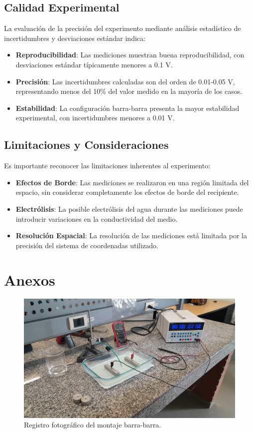 \documentclass[11pt,twocolumn]{article}
\begin{document}
\subsection{Calidad Experimental}

La evaluación de la precisión del experimento mediante análisis estadístico de incertidumbres y desviaciones estándar indica:

\begin{itemize}
\item \textbf{Reproducibilidad}: Las mediciones muestran buena reproducibilidad, con desviaciones estándar típicamente menores a 0.1 V.
\item \textbf{Precisión}: Las incertidumbres calculadas son del orden de 0.01-0.05 V, representando menos del 10\% del valor medido en la mayoría de los casos.
\item \textbf{Estabilidad}: La configuración barra-barra presenta la mayor estabilidad experimental, con incertidumbres menores a 0.01 V.
\end{itemize}

\subsection{Limitaciones y Consideraciones}

Es importante reconocer las limitaciones inherentes al experimento:

\begin{itemize}
\item \textbf{Efectos de Borde}: Las mediciones se realizaron en una región limitada del espacio, sin considerar completamente los efectos de borde del recipiente.
\item \textbf{Electrólisis}: La posible electrólisis del agua durante las mediciones puede introducir variaciones en la conductividad del medio.
\item \textbf{Resolución Espacial}: La resolución de las mediciones está limitada por la precisión del sistema de coordenadas utilizado.
\end{itemize}


\section{Anexos}
\graphicspath{{Anexos/}}

\begin{figure}[H]
\centering
\includegraphics[width=0.95\columnwidth]{img1.jpg}
\caption{Registro fotográfico del montaje barra-barra.}
\label{fig:anexo1}
\end{figure}
\end{document}
